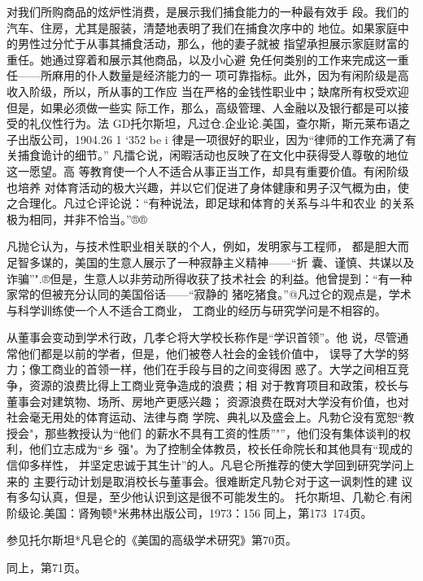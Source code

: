对我们所购商品的炫炉性消费，是展示我们捕食能力的一种最有效手
段。我们的汽车、住房，尤其是服装，清楚地表明了我们在捕食次序中的
地位。如果家庭中的男性过分忙于从事其捕食活动，那么，他的妻子就被
指望承担展示家庭财富的重任。她通过穿着和展示其他商品，以及小心避
免任何类别的工作来完成这一重任——所麻用的仆人数量是经济能力的一
项可靠指标。此外，因为有闲阶级是高收入阶级，所以，所从事的工作应
当在严格的金钱性职业中；缺席所有权受欢迎但是，如果必须做一些实
际工作，那么，高级管理、人金融以及银行都是可以接受的礼仪性行为。法
GD托尔斯坦，凡过仓.企业论.美国，查尔斯，斯元莱布语之子出版公司，1904.26
1
‘352
be
i
律是一项很好的职业，因为“律师的工作充满了有关捕食诡计的细节。”
凡擂仑说，闲暇活动也反映了在文化中获得受人尊敬的地位这一愿望。高
等教育使一个人不适合从事正当工作，却具有重要价值。有闲阶级也培养
对体育活动的极大兴趣，并以它们促进了身体健康和男子汉气概为由，使
之合理化。凡过仑评论说：“有种说法，即足球和体育的关系与斗牛和农业
的关系极为相同，并非不恰当。”®®

凡抛仑认为，与技术性职业相关联的个人，例如，发明家与工程师，
都是胆大而足智多谋的，美国的生意人展示了一种寂静主义精神——“折
囊、谨慎、共谋以及诈骗”".®但是，生意人以非劳动所得收获了技术社会
的利益。他曾提到：“有一种家常的但被充分认同的美国俗话——“寂静的
猪吃猪食。”@凡过仑的观点是，学术与科学训练使一个人不适合工商业，
工商业的经历与研究学问是不相容的。

从董事会变动到学术行政，几孝仑将大学校长称作是“学识首领”。他
说，尽管通常他们都是以前的学者，但是，他们被卷人社会的金钱价值中，
误导了大学的努力；像工商业的首领一样，他们在手段与目的之间变得困
惑了。大学之间相互竞争，资源的浪费比得上工商业竞争造成的浪费；相
对于教育项目和政策，校长与董事会对建筑物、场所、房地产更感兴趣；
资源浪费在既对大学没有价值，也对社会毫无用处的体育运动、法律与商
学院、典礼以及盛会上。凡勃仑没有宽恕“教授会"，那些教授认为“他们
的薪水不具有工资的性质”"”，他们没有集体谈判的权利，他们立志成为“乡
强"。为了控制全体教员，校长任命院长和其他具有“现成的信仰多样性，
并坚定忠诚于其生计”的人。凡皂仑所推荐的使大学回到研究学问上来的
主要行动计划是取消校长与董事会。很难断定凡勃仑对于这一讽刺性的建
议有多勾认真，但是，至少他认识到这是很不可能发生的。
托尔斯坦、几勒仑.有闲阶级论.美国：肾殉顿*米弗林出版公司，1973：156
同上，第173~174页。

参见托尔斯坦*凡皂仑的《美国的高级学术研究》第70页。

同上，第71页。

